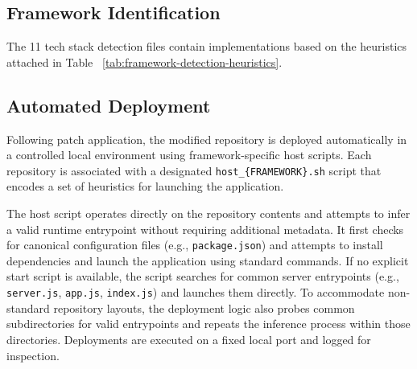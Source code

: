 
\subsection{Framework Identification}
\label{subsection:build_commands}
The 11 tech stack detection files contain implementations based on the heuristics attached in Table ~\ref{tab:framework-detection-heuristics}. 





\subsection{Automated Deployment}
Following patch application, the modified repository is deployed automatically in a controlled local environment using framework-specific host scripts. Each repository is associated with a designated \texttt{host\_\{FRAMEWORK\}.sh} script that encodes a set of heuristics for launching the application.

The host script operates directly on the repository contents and attempts to infer a valid runtime entrypoint without requiring additional metadata. It first checks for canonical configuration files (e.g., \texttt{package.json}) and attempts to install dependencies and launch the application using standard commands. If no explicit start script is available, the script searches for common server entrypoints (e.g., \texttt{server.js}, \texttt{app.js}, \texttt{index.js}) and launches them directly. To accommodate non-standard repository layouts, the deployment logic also probes common subdirectories for valid entrypoints and repeats the inference process within those directories. Deployments are executed on a fixed local port and logged for inspection. 



